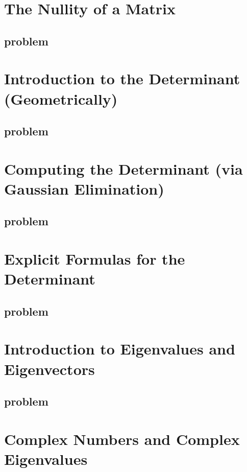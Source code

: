 \documentclass{article}
\begin{document}
\section{The Nullity of a Matrix}
\subsection{problem}
\begin{enumerate}
\end{enumerate}
\section{Introduction to the Determinant (Geometrically)}
\subsection{problem}
\begin{enumerate}
\end{enumerate}
\section{Computing the Determinant (via Gaussian Elimination)}
\subsection{problem}
\begin{enumerate}
\end{enumerate}
\section{Explicit Formulas for the Determinant}
\subsection{problem}
\begin{enumerate}
\end{enumerate}
\section{Introduction to Eigenvalues and Eigenvectors}
\subsection{problem}
\begin{enumerate}
\end{enumerate}
\section{Complex Numbers and Complex Eigenvalues}
\end{document}
